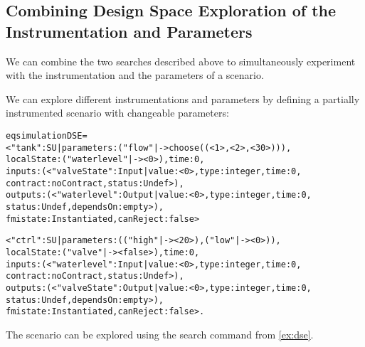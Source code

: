 \subsection{Combining Design Space Exploration of the Instrumentation and Parameters}
We can combine the two searches described above to simultaneously  experiment with the instrumentation and the parameters of a scenario.

\begin{example}
  We can explore different instrumentations and parameters by defining a partially instrumented scenario with changeable parameters:

\scriptsize
\begin{alltt}
eq simulationDSE =  
< "tank" : SU | parameters : ("flow" |-> choose((< 1 >,< 2 >,< 30 >))), 
localState : ( "waterlevel" |-> < 0 > ) , time : 0, 
inputs : (< "valveState" : Input | value : < 0 >, type : integer, time : 0, 
                                   contract : noContract, status : Undef  >), 
outputs : (< "waterlevel" : Output | value : < 0 >, type : integer, time : 0, 
                                     status : Undef, dependsOn : empty >), 
fmistate : Instantiated, canReject : false >

< "ctrl" : SU | parameters : (("high" |-> < 20 >) , ("low" |-> < 0 >)), 
localState : ( "valve" |-> < false >), time : 0, 
inputs : (< "waterlevel" : Input | value : < 0 >, type : integer, time : 0, 
                                   contract : noContract, status : Undef  >), 
outputs : (< "valveState" : Output | value : < 0 >, type : integer, time : 0, 
                                     status : Undef, dependsOn : empty >), 
fmistate : Instantiated, canReject : false > .
\end{alltt}
\normalsize

The scenario can be explored using the search command from \cref{ex:dse}. 
\end{example}



